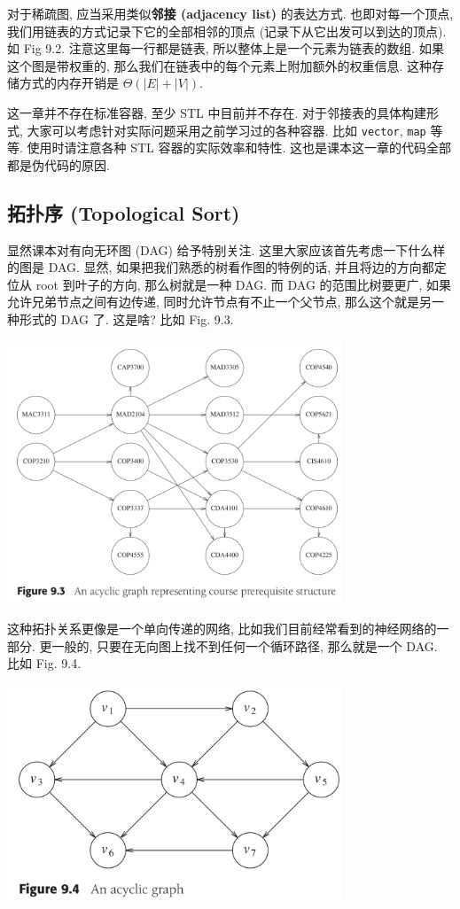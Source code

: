 \documentclass[a4paper]{ctexart}
\theoremstyle{definition}
\theoremstyle{definition}
\begin{document}
对于稀疏图, 应当采用类似{\bf 邻接 (adjacency list)} 的表达方式. 也即对每一个顶点,
我们用链表的方式记录下它的全部相邻的顶点 (记录下从它出发可以到达的顶点).
如 Fig 9.2. 注意这里每一行都是链表, 所以整体上是一个元素为链表的数组.
如果这个图是带权重的, 那么我们在链表中的每个元素上附加额外的权重信息.
这种存储方式的内存开销是 $\Theta(|E| + |V|)$.

这一章并不存在标准容器, 至少 STL 中目前并不存在. 对于邻接表的具体构建形式,
大家可以考虑针对实际问题采用之前学习过的各种容器. 比如 \verb|vector|, \verb|map| 等等.
使用时请注意各种 STL 容器的实际效率和特性. 这也是课本这一章的代码全部都是伪代码的原因.

\subsection{拓扑序 (Topological Sort)}

显然课本对有向无环图 (DAG) 给予特别关注. 这里大家应该首先考虑一下什么样的图是 DAG.
显然, 如果把我们熟悉的树看作图的特例的话, 并且将边的方向都定位从 root 到叶子的方向,
那么树就是一种 DAG. 而 DAG 的范围比树要更广, 如果允许兄弟节点之间有边传递,
同时允许节点有不止一个父节点, 那么这个就是另一种形式的 DAG 了. 这是啥? 
比如 Fig. 9.3. 
\begin{center}
  \includegraphics[width=0.75\textwidth]{images/FIG9_3.png}
\end{center}
这种拓扑关系更像是一个单向传递的网络,
比如我们目前经常看到的神经网络的一部分. 更一般的,
只要在无向图上找不到任何一个循环路径, 那么就是一个 DAG. 比如 Fig. 9.4.
\begin{center}
  \includegraphics[width=0.75\textwidth]{images/FIG9_4.png}
\end{center}
\end{document}
